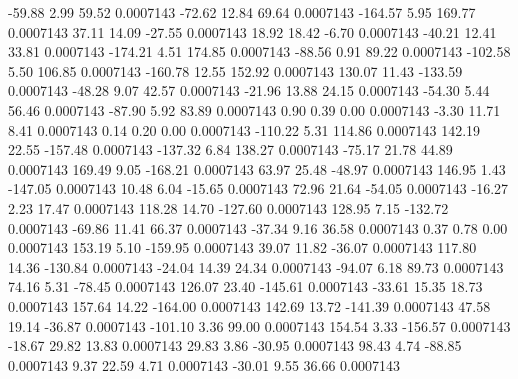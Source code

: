       -59.88        2.99       59.52     0.0007143
      -72.62       12.84       69.64     0.0007143
     -164.57        5.95      169.77     0.0007143
       37.11       14.09      -27.55     0.0007143
       18.92       18.42       -6.70     0.0007143
      -40.21       12.41       33.81     0.0007143
     -174.21        4.51      174.85     0.0007143
      -88.56        0.91       89.22     0.0007143
     -102.58        5.50      106.85     0.0007143
     -160.78       12.55      152.92     0.0007143
      130.07       11.43     -133.59     0.0007143
      -48.28        9.07       42.57     0.0007143
      -21.96       13.88       24.15     0.0007143
      -54.30        5.44       56.46     0.0007143
      -87.90        5.92       83.89     0.0007143
        0.90        0.39        0.00     0.0007143
       -3.30       11.71        8.41     0.0007143
        0.14        0.20        0.00     0.0007143
     -110.22        5.31      114.86     0.0007143
      142.19       22.55     -157.48     0.0007143
     -137.32        6.84      138.27     0.0007143
      -75.17       21.78       44.89     0.0007143
      169.49        9.05     -168.21     0.0007143
       63.97       25.48      -48.97     0.0007143
      146.95        1.43     -147.05     0.0007143
       10.48        6.04      -15.65     0.0007143
       72.96       21.64      -54.05     0.0007143
      -16.27        2.23       17.47     0.0007143
      118.28       14.70     -127.60     0.0007143
      128.95        7.15     -132.72     0.0007143
      -69.86       11.41       66.37     0.0007143
      -37.34        9.16       36.58     0.0007143
        0.37        0.78        0.00     0.0007143
      153.19        5.10     -159.95     0.0007143
       39.07       11.82      -36.07     0.0007143
      117.80       14.36     -130.84     0.0007143
      -24.04       14.39       24.34     0.0007143
      -94.07        6.18       89.73     0.0007143
       74.16        5.31      -78.45     0.0007143
      126.07       23.40     -145.61     0.0007143
      -33.61       15.35       18.73     0.0007143
      157.64       14.22     -164.00     0.0007143
      142.69       13.72     -141.39     0.0007143
       47.58       19.14      -36.87     0.0007143
     -101.10        3.36       99.00     0.0007143
      154.54        3.33     -156.57     0.0007143
      -18.67       29.82       13.83     0.0007143
       29.83        3.86      -30.95     0.0007143
       98.43        4.74      -88.85     0.0007143
        9.37       22.59        4.71     0.0007143
      -30.01        9.55       36.66     0.0007143
